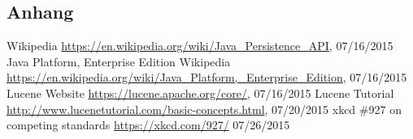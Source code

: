 \subsection*{Anhang}\label{anhang}

%
%
\begin{thebibliography}{99}
	Wikipedia
	\url{https://en.wikipedia.org/wiki/Java_Persistence_API}, 07/16/2015
	Java Platform, Enterprise Edition
	Wikipedia
	\url{https://en.wikipedia.org/wiki/Java_Platform,_Enterprise_Edition}, 07/16/2015
	Lucene Website
	\url{https://lucene.apache.org/core/}, 07/16/2015
	Lucene Tutorial
	\url{http://www.lucenetutorial.com/basic-concepts.html}, 07/20/2015
	xkcd \#927 on competing standards
	\url{https://xkcd.com/927/}
	07/26/2015
	
	
\end{thebibliography}
